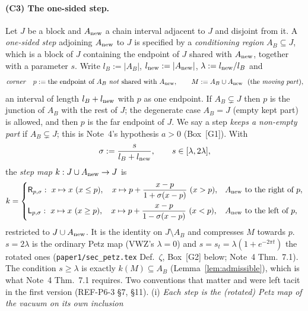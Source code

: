 \documentclass[11pt]{article}
\newcommand{\Rp}{\mathsf R}
\newcommand{\Lp}{\mathsf L}
\theoremstyle{definition}\newtheorem{example}[theorem]{Example}
\begin{document}
\paragraph{(C3) The one-sided step.}
Let $J$ be a block and $A_{\rm new}$ a chain interval adjacent to $J$ and disjoint from it.  A
\emph{one-sided step} adjoining $A_{\rm new}$ to $J$ is specified by a \emph{conditioning region}
$A_B\subseteq J$, which is a block of $J$ containing the endpoint of $J$ shared with
$A_{\rm new}$, together with a parameter $s$.  Write $l_B:=|A_B|$, $l_{\rm new}:=|A_{\rm new}|$,
$\lambda:=l_{\rm new}/l_B$ and
\begin{equation}\label{eq:corner-def}
 \text{\emph{corner}}\quad p:=\text{the endpoint of $A_B$ \emph{not} shared with $A_{\rm new}$},
 \qquad
 M:=A_B\cup A_{\rm new}\ \ (\text{the \emph{moving part}}),
\end{equation}
an interval of length $l_B+l_{\rm new}$ with $p$ as one endpoint.  If $A_B\subsetneq J$ then $p$
is the junction of $A_B$ with the rest of $J$; the degenerate case $A_B=J$ (empty kept part) is
allowed, and then $p$ is the far endpoint of $J$.  We say a step \emph{keeps a non-empty part} if
$A_B\subsetneq J$; this is Note~4's hypothesis $a>0$ (Box~[G1]).  With
\begin{equation}\label{eq:sigma}
 \sigma:=\frac s{l_B+l_{\rm new}},\qquad s\in[\lambda,2\lambda],
\end{equation}
the \emph{step map} $k:J\cup A_{\rm new}\to J$ is
\begin{equation}\label{eq:step-map}
 k=\begin{cases}
 \Rp_{p,\sigma}:\ x\mapsto x\ (x\le p),\quad x\mapsto p+\dfrac{x-p}{1+\sigma(x-p)}\ (x>p),
 &\text{$A_{\rm new}$ to the right of $p$},\\[2.2ex]
 \Lp_{p,\sigma}:\ x\mapsto x\ (x\ge p),\quad x\mapsto p+\dfrac{x-p}{1-\sigma(x-p)}\ (x<p),
 &\text{$A_{\rm new}$ to the left of $p$},
 \end{cases}
\end{equation}
restricted to $J\cup A_{\rm new}$.  It is the identity on $J\setminus A_B$ and compresses $M$
towards $p$.  $s=2\lambda$ is the ordinary Petz map (VWZ's $\lambda=0$) and
$s=s_t=\lambda(1+e^{-2\pi t})$ the rotated ones (\texttt{paper1/sec\_petz.tex}
Def.~$\zeta$, Box~[G2] below; Note~4 Thm.~7.1).  The condition $s\ge\lambda$ is exactly
$k(M)\subseteq A_B$ (Lemma~\ref{lem:admissible}), which is what Note~4 Thm.~7.1 requires.
Two conventions that matter and were left tacit in the first version (REF-P6-3 \S7, \S11).
(i) \emph{Each step is the (rotated) Petz map of the \emph{vacuum} on its own inclusion}
\end{document}
